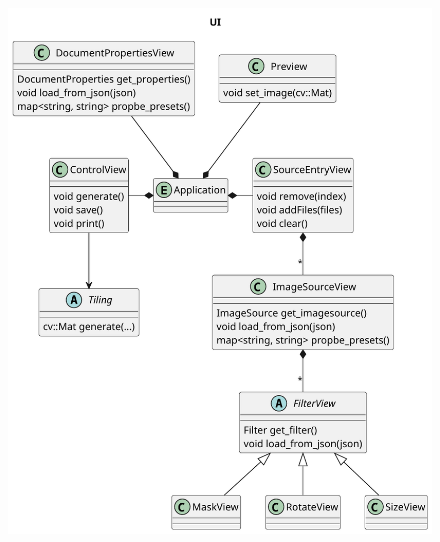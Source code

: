 \begin{figure}
    \centering
    \includegraphics[width=14cm]{figures/uml/ui.pdf}
    \label{fig:UI_uml}
\end{figure}
